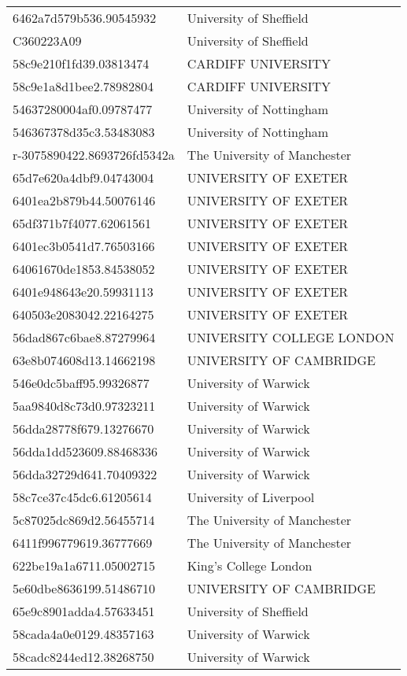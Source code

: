 \begin{tabular}{ll}
6462a7d579b536.90545932 & University of Sheffield \\
C360223A09 & University of Sheffield \\
58c9e210f1fd39.03813474 & CARDIFF UNIVERSITY \\
58c9e1a8d1bee2.78982804 & CARDIFF UNIVERSITY \\
54637280004af0.09787477 & University of Nottingham \\
546367378d35c3.53483083 & University of Nottingham \\
r-3075890422.8693726fd5342a & The University of Manchester \\
65d7e620a4dbf9.04743004 & UNIVERSITY OF EXETER \\
6401ea2b879b44.50076146 & UNIVERSITY OF EXETER \\
65df371b7f4077.62061561 & UNIVERSITY OF EXETER \\
6401ec3b0541d7.76503166 & UNIVERSITY OF EXETER \\
64061670de1853.84538052 & UNIVERSITY OF EXETER \\
6401e948643e20.59931113 & UNIVERSITY OF EXETER \\
640503e2083042.22164275 & UNIVERSITY OF EXETER \\
56dad867c6bae8.87279964 & UNIVERSITY COLLEGE LONDON \\
63e8b074608d13.14662198 & UNIVERSITY OF CAMBRIDGE \\
546e0dc5baff95.99326877 & University of Warwick \\
5aa9840d8c73d0.97323211 & University of Warwick \\
56dda28778f679.13276670 & University of Warwick \\
56dda1dd523609.88468336 & University of Warwick \\
56dda32729d641.70409322 & University of Warwick \\
58c7ce37c45dc6.61205614 & University of Liverpool \\
5c87025dc869d2.56455714 & The University of Manchester \\
6411f996779619.36777669 & The University of Manchester \\
622be19a1a6711.05002715 & King's College London \\
5e60dbe8636199.51486710 & UNIVERSITY OF CAMBRIDGE \\
65e9c8901adda4.57633451 & University of Sheffield \\
58cada4a0e0129.48357163 & University of Warwick \\
58cadc8244ed12.38268750 & University of Warwick \\

\end{tabular}
